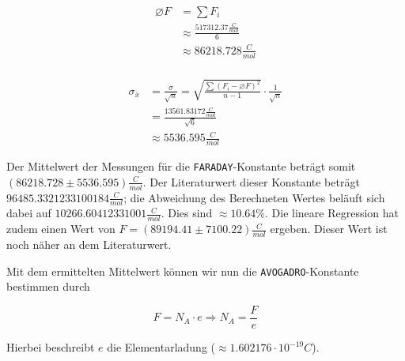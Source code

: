 \documentclass[10pt,a4paper]{article}
\begin{document}
\begin{figure}[h]
\centering
\begin{subfigure}[c]{0.5\textwidth}
\begin{align*}
\varnothing F &= \sum F_i \\
&\approx \frac{517312.37 \frac{C}{mol}}{6} \\
&\approx 86218.728 \frac{C}{mol} \\
\end{align*}
\end{subfigure}%
\begin{subfigure}[c]{0.5\textwidth}
\begin{align*}
\sigma_{\bar{x}} &= \frac{\sigma}{\sqrt{n}} = \sqrt{\frac{\sum(F_i - \varnothing F)^2}{n-1}} \cdot \frac{1}{\sqrt{n}} \\
&= \frac{13561.83172 \frac{C}{mol}}{\sqrt{6}} \\
&\approx 5536.595 \frac{C}{mol}
\end{align*}
\end{subfigure}%
\end{figure}

\begin{flushleft}
Der Mittelwert der Messungen für die \texttt{FARADAY}-Konstante beträgt somit $(86218.728 \pm 5536.595) \frac{C}{mol}$. Der Literaturwert \cite{Farad} dieser Konstante beträgt $96485.3321233100184 \frac{C}{mol}$; die Abweichung des Berechneten Wertes beläuft sich dabei auf $10266.60412331001 \frac{C}{mol}$. Dies sind $\approx 10.64\%$. Die lineare Regression hat zudem einen Wert von $F = (89194.41 \pm 7100.22) \frac{C}{mol}$ ergeben. Dieser Wert ist noch näher an dem Literaturwert.


Mit dem ermittelten Mittelwert können wir nun die \texttt{AVOGADRO}-Konstante bestimmen durch

\begin{equation*}
F = N_A \cdot e \Rightarrow N_A = \frac{F}{e}
\end{equation*}

Hierbei beschreibt $e$ die Elementarladung ($\approx 1.602176 \cdot 10^{-19} C$).
\end{flushleft}
\end{document}
